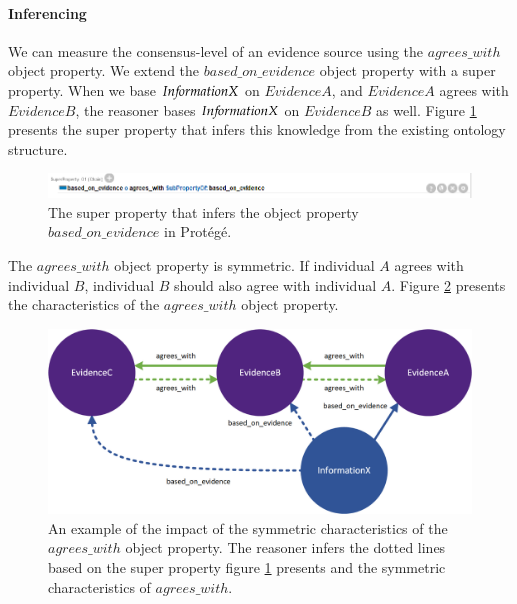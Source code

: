 \paragraph{Inferencing}
We can measure the consensus-level of an evidence source using the $agrees\_with$ object property. We extend the $based\_on\_evidence$ object property with a super property. When we base $In{\mkern-2mu f\mkern-3mu}ormationX$ on $EvidenceA$, and $EvidenceA$ agrees with $EvidenceB$, the reasoner bases $In{\mkern-2mu f\mkern-3mu}ormationX$ on $EvidenceB$ as well. Figure \ref{fig:consensus_inferred} presents the super property that infers this knowledge from the existing ontology structure.

\begin{figure}[H]
\centering
  \includegraphics[width=17cm]{../../Images/Consensus_Inferred.png}
  \caption{The super property that infers the object property $based\_on\_evidence$ in Prot\'eg\'e.}
  \label{fig:consensus_inferred}
\end{figure}

The $agrees\_with$ object property is symmetric. If individual $A$ agrees with individual $B$, individual $B$ should also agree with individual $A$. Figure \ref{fig:consensus_transitive} presents the characteristics of the $agrees\_with$ object property.

\begin{figure}[H]
\centering
  \includegraphics[width=13cm]{../../Images/04_Contribution/04_Consensus_Characteristics.png}
  \caption{An example of the impact of the symmetric characteristics of the $agrees\_with$ object property. The reasoner infers the dotted lines based on the super property figure \ref{fig:consensus_inferred} presents and the symmetric characteristics of $agrees\_with$.}
  \label{fig:consensus_transitive}
\end{figure}

